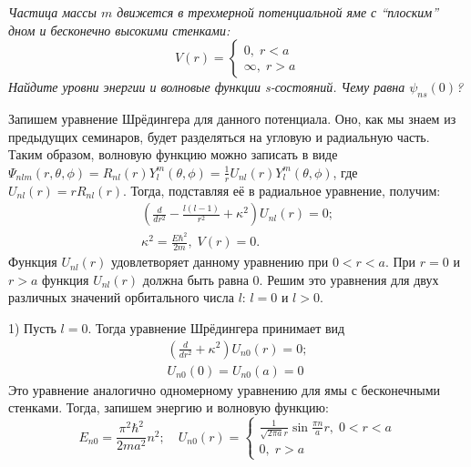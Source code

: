 \begin{center}
    \textit{Частица массы $m$ движется в трехмерной потенциальной яме с ``плоским'' дном и бесконечно высокими стенками:}
    \[
    V(r)=
    \begin{cases}
        0,\; r<a\\
        \infty, \; r>a
    \end{cases}
    \]
    \textit{Найдите уровни энергии и волновые функции s-состояний. Чему равна $\psi_{ns}(0)$?}
\end{center}
Запишем уравнение Шрёдингера для данного потенциала. Оно, как мы знаем из предыдущих семинаров, будет разделяться на угловую и радиальную часть. Таким образом, волновую функцию можно записать в виде $\Psi_{nlm}(r, \theta, \phi) = R_{nl}(r)Y^{m}_l(\theta, \phi) = \frac{1}{r}U_{nl}(r)Y^{m}_l(\theta, \phi)$, где $U_{nl}(r) = rR_{nl}(r)$. Тогда, подставляя её в радиальное уравнение, получим:
\begin{gather*}
\left(\frac{d}{dr^2} - \frac{l(l-1)}{r^2} + \kappa^2\right)U_{nl}(r) = 0;\\ 
\kappa^2 = \frac{E\hbar^2}{2m},\; V(r) = 0.
\end{gather*}
Функция $U_{nl}(r)$ удовлетворяет данному уравнению при $ 0 < r < a$. При $r = 0$ и $r > a$ функция $U_{nl}(r)$ должна быть равна 0. Решим это уравнения для двух различных значений орбитального числа $l$: $l = 0$ и $l>0$.

1) Пусть $l = 0$. Тогда уравнение Шрёдингера принимает вид 
\begin{gather*}
\left(\frac{d}{dr^2} + \kappa^2\right)U_{n0}(r) = 0;\\
U_{n0}(0) = U_{n0}(a) = 0
\end{gather*}
Это уравнение аналогично одномерному уравнению для ямы с бесконечными стенками. Тогда, запишем энергию и волновую функцию:
\[
E_{n0} = \frac{\pi^2\hbar^2}{2ma^2}n^2;\quad U_{n0}(r) =
\begin{cases}
    \frac{1}{\sqrt{2\pi a}r}\sin\frac{\pi n}{a}r, \; 0 < r < a\\
    0, \; r > a
\end{cases}
\]

